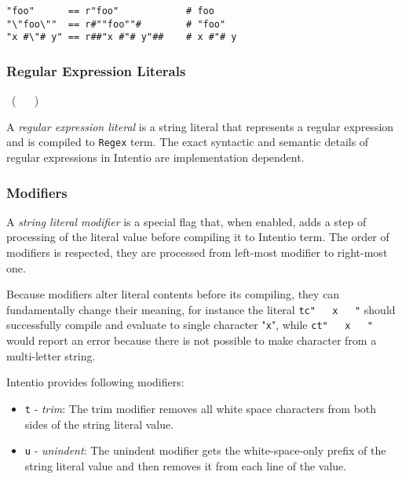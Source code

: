 \begin{example}
\begin{lstlisting}
"foo"      == r"foo"            # foo
"\"foo\""  == r#""foo""#        # "foo"
"x #\"# y" == r##"x #"# y"##    # x #"# y
\end{lstlisting}
\end{example}

\subsubsection*{Regular Expression Literals}

\begin{bnf}
   \eq {} \ ( \  \gor {} \ )
\end{bnf}

A \emph{regular expression literal} is a string literal that represents a regular expression and is compiled to \lstinline{Regex} term. The exact syntactic and semantic details of regular expressions in Intentio are implementation dependent.

\subsubsection*{Modifiers}

\begin{bnf}
   \eq {} \gor {}
\end{bnf}

A \emph{string literal modifier} is a special flag that, when enabled, adds a step of processing of the literal value before compiling it to Intentio term. The order of modifiers is respected, they are processed from left-most modifier to right-most one.

Because modifiers alter literal contents before its compiling, they can fundamentally change their meaning, for instance the literal \lstinline{tc"   x   "} should successfully compile and evaluate to single character "\texttt{x}", while \lstinline{ct"   x   "} would report an error because there is not possible to make character from a multi-letter string.

Intentio provides following modifiers:

\begin{itemize}
  \item \texttt{t} - \emph{trim}: The trim modifier removes all white space characters from both sides of the string literal value.
  \item \texttt{u} - \emph{unindent}: The unindent modifier gets the white-space-only prefix of the string literal value and then removes it from each line of the value.
\end{itemize}


